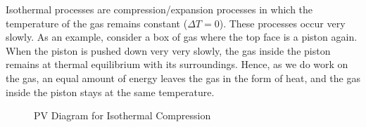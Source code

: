 \documentclass[12pt, a4paper]{article}
\newcounter{exa}
\begin{document}
Isothermal processes are compression/expansion processes in which the temperature of the gas remains constant ($\Delta T = 0$). These processes occur very slowly. As an example, consider a box of gas where the top face is a piston again. When the piston is pushed down very very slowly, the gas inside the piston remains at thermal equilibrium with its surroundings. Hence, as we do work on the gas, an equal amount of energy leaves the gas in the form of heat, and the gas inside the piston stays at the same temperature.

\begin{figure}[H]
\centering
\caption{PV Diagram for Isothermal Compression}
\end{figure}
\end{document}
